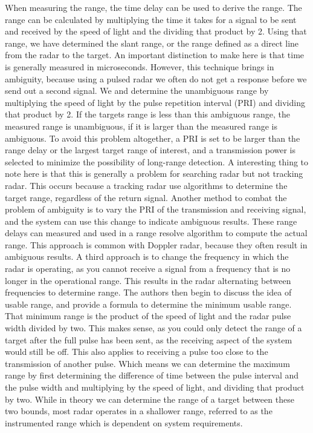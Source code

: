 \documentclass[12pt]{article}
\begin{document}
When measuring the range, the time delay can be used to derive the range. The range can be calculated by multiplying the time it takes for a signal to be sent and received by the speed of light and the dividing that product by 2. Using that range, we have determined the slant range, or the range defined as a direct line from the radar to the target. An important distinction to make here is that time is generally measured in microseconds. However, this technique brings in ambiguity, because using a pulsed radar we often do not get a response before we send out a second signal. We and determine the unambiguous range by multiplying the speed of light by the pulse repetition interval (PRI) and dividing that product by 2. If the targets range is less than this ambiguous range, the measured range is unambiguous, if it is larger than the measured range is ambiguous. To avoid this problem altogether, a PRI is set to be larger than the range delay or the largest target range of interest, and a transmission power is selected to minimize the possibility of long-range detection. A interesting thing to note here is that this is generally a problem for searching radar but not tracking radar. This occurs because a tracking radar use algorithms to determine the target range, regardless of the return signal. 
Another method to combat the problem of ambiguity is to vary the PRI of the transmission and receiving signal,  and the system can use this change to indicate ambiguous results. These range delays can measured and used in a range resolve algorithm to compute the actual range. This approach is common with Doppler radar, because they often result in ambiguous results. A third approach is to change the frequency in which the radar is operating, as you cannot receive a signal from a frequency that is no longer in the operational range. This results in the radar alternating between frequencies to determine range.
The authors then begin to discuss the idea of usable range, and provide a formula to determine the minimum usable range. That minimum range is the product of the speed of light and the radar pulse width divided by two. This makes sense, as you could only detect the range of a target after the full pulse has been sent, as the receiving aspect of the system would still be off. This also applies to receiving a pulse too close to the transmission of another pulse. Which means we can determine the maximum range by first determining the difference of time between the pulse interval and the pulse width and multiplying by the speed of light, and dividing that product by two. While in theory we can determine the range of a target between these two bounds, most radar operates in a shallower range, referred to as the instrumented range which is dependent on system requirements. 
\end{document}

